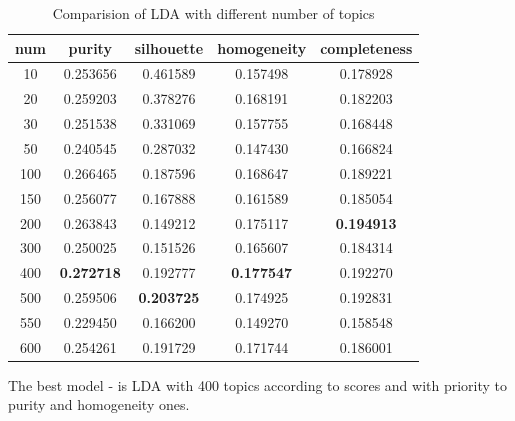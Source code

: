 \documentclass[11pt]{article}
\begin{document}
\begin{table}[htb]
\begin{center}
\begin{tabular}{ |c|c|c|c|c| }
\hline
num & purity  & silhouette  & homogeneity  & completeness \\ \hline 
10  & 0.253656  & 0.461589  & 0.157498  & 0.178928  \\ \hline 
20  & 0.259203  & 0.378276  & 0.168191  & 0.182203  \\ \hline 
30  & 0.251538  & 0.331069  & 0.157755  & 0.168448  \\ \hline 
50  & 0.240545  & 0.287032  & 0.147430  & 0.166824  \\ \hline 
100  & 0.266465  & 0.187596  & 0.168647  & 0.189221 \\ \hline 
150  & 0.256077  & 0.167888  & 0.161589  & 0.185054 \\ \hline 
200  & 0.263843  & 0.149212  & 0.175117  & \textbf{0.194913} \\ \hline 
300  & 0.250025  & 0.151526  & 0.165607  & 0.184314 \\ \hline 
400  & \textbf{0.272718}  & 0.192777  & \textbf{0.177547}  & 0.192270 \\ \hline 
500  & 0.259506  & \textbf{0.203725}  & 0.174925  & 0.192831 \\ \hline 
550  & 0.229450  & 0.166200  & 0.149270  & 0.158548 \\ \hline 
600  & 0.254261  & 0.191729  & 0.171744  & 0.186001 \\
\hline 
\end{tabular}
\caption{Comparision of LDA with different number of topics}
\label{LDA_num_topic}
\end{center}
\end{table}
\FloatBarrier

The best model - is LDA with 400 topics according to scores and with priority to purity and homogeneity ones.
\end{document}
